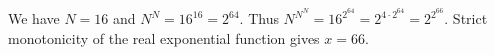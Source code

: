 We have $N=16$ and $N^N=16^{16}=2^{64}$. Thus $N^{N^N}=16^{2^{64}}=2^{4\cdot2^{64}}=2^{2^{66}}$. Strict monotonicity of the real exponential function gives $\boxed{x=66}$.
